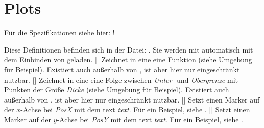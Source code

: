 \section{Plots \tiny{}}
\begin{center}
    Für die Spezifikationen siehe hier: !
\end{center}
Diese Definitionen befinden sich in der Datei: . Sie werden mit  automatisch mit dem Einbinden von  geladen.\medskip\newline
%
%
%
[]
Zeichnet in eine  eine Funktion (siehe Umgebung für Beispiel). Existiert auch außerhalb von , ist aber hier nur eingeschränkt nutzbar.\medskip\newline
%
%
%
[\secline{}]
Zeichnet in eine  eine Folge zwischen \emph{Unter-} und \emph{Obergrenze} mit Punkten der Größe \emph{Dicke} (siehe Umgebung für Beispiel). Existiert auch außerhalb von , ist aber hier nur eingeschränkt nutzbar.\medskip\newline
%
%
%
[]
Setzt einen Marker auf der $x$-Achse bei \emph{PosX} mit dem text \emph{text}. Für ein Beispiel, siehe .\medskip\newline
%
%
%
[]
Setzt einen Marker auf der $y$-Achse bei \emph{PosY} mit dem text \emph{text}. Für ein Beispiel, siehe .\medskip\newline






